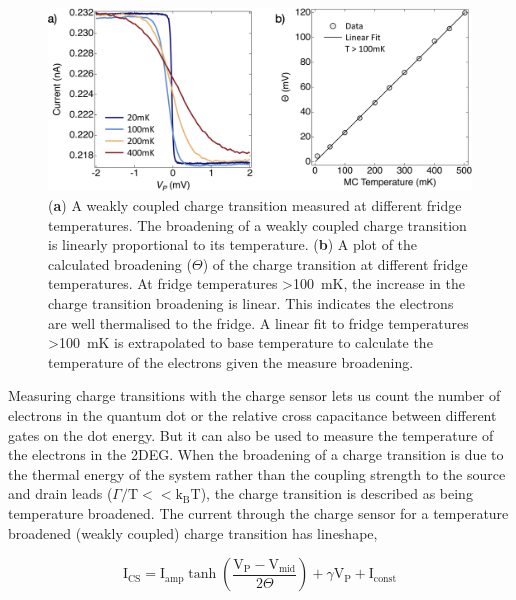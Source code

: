 \begin{figure}[!htb]
  \begin{center}
    \includegraphics[width=1.0\textwidth]{figures/ch1/crop_PosterFiguresMaster.005.png}
    \caption[Calculating the electron temperature]{\label{fig:ch1/electron_temp} 
    (\textbf{a}) A weakly coupled charge transition measured at different fridge temperatures. The broadening of a weakly coupled charge transition is linearly proportional to its temperature. (\textbf{b}) A plot of the calculated broadening ($\Theta$) of the charge transition at different fridge temperatures. At fridge temperatures \qty{>100}{mK}, the increase in the charge transition broadening is linear. This indicates the electrons are well thermalised to the fridge. A linear fit to fridge temperatures \qty{>100}{mK} is extrapolated to base temperature to calculate the temperature of the electrons given the measure broadening. 
      }
  \end{center}
\end{figure}

Measuring charge transitions with the charge sensor lets us count the number of electrons in the quantum dot or the relative cross capacitance between different gates on the dot energy. But it can also be used to measure the temperature of the electrons in the 2DEG. When the broadening of a charge transition is due to the thermal energy of the system rather than the coupling strength to the source and drain leads ($\Gamma/\mathrm{T} << \mathrm{k_B T}$), the charge transition is described as being temperature broadened. The current through the charge sensor for a temperature broadened (weakly coupled) charge transition has lineshape,

\begin{equation}\label{eq:cs_lineshape}
  \mathrm{I_{CS}} = 
  \mathrm{I_{amp}}
  \tanh
  \left( 
  \frac{\mathrm{V_P - V_{mid}}}{2\Theta}
  \right) + 
  \gamma \mathrm{V_P}
  + \mathrm{I_{const}}
\end{equation}


